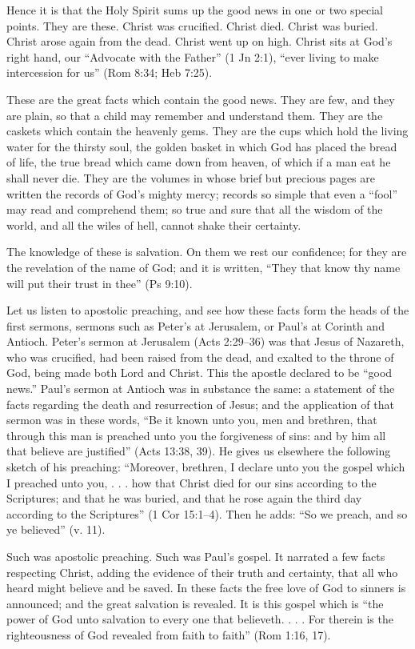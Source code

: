 \documentclass[
]{book}
\begin{document}
Hence it is that the Holy Spirit sums up the good news in one or two special points. They are these. Christ was crucified. Christ died. Christ was buried. Christ arose again from the dead. Christ went up on high. Christ sits at God's right hand, our ``Advocate with the Father'' (1 Jn 2:1), ``ever living to make intercession for us'' (Rom 8:34; Heb 7:25).

These are the great facts which contain the good news. They are few, and they are plain, so that a child may remember and understand them. They are the caskets which contain the heavenly gems. They are the cups which hold the living water for the thirsty soul, the golden basket in which God has placed the bread of life, the true bread which came down from heaven, of which if a man eat he shall never die. They are the volumes in whose brief but precious pages are written the records of God's mighty mercy; records so simple that even a ``fool'' may read and comprehend them; so true and sure that all the wisdom of the world, and all the wiles of hell, cannot shake their certainty.

The knowledge of these is salvation. On them we rest our confidence; for they are the revelation of the name of God; and it is written, ``They that know thy name will put their trust in thee'' (Ps 9:10).

Let us listen to apostolic preaching, and see how these facts form the heads of the first sermons, sermons such as Peter's at Jerusalem, or Paul's at Corinth and Antioch. Peter's sermon at Jerusalem (Acts 2:29--36) was that Jesus of Nazareth, who was crucified, had been raised from the dead, and exalted to the throne of God, being made both Lord and Christ. This the apostle declared to be ``good news.'' Paul's sermon at Antioch was in substance the same: a statement of the facts regarding the death and resurrection of Jesus; and the application of that sermon was in these words, ``Be it known unto you, men and brethren, that through this man is preached unto you the forgiveness of sins: and by him all that believe are justified'' (Acts 13:38, 39). He gives us elsewhere the following sketch of his preaching: ``Moreover, brethren, I declare unto you the gospel which I preached unto you, . . . how that Christ died for our sins according to the Scriptures; and that he was buried, and that he rose again the third day according to the Scriptures'' (1 Cor 15:1--4). Then he adds: ``So we preach, and so ye believed'' (v. 11).

Such was apostolic preaching. Such was Paul's gospel. It narrated a few facts respecting Christ, adding the evidence of their truth and certainty, that all who heard might believe and be saved. In these facts the free love of God to sinners is announced; and the great salvation is revealed. It is this gospel which is ``the power of God unto salvation to every one that believeth. . . . For therein is the righteousness of God revealed from faith to faith'' (Rom 1:16, 17).
\end{document}
